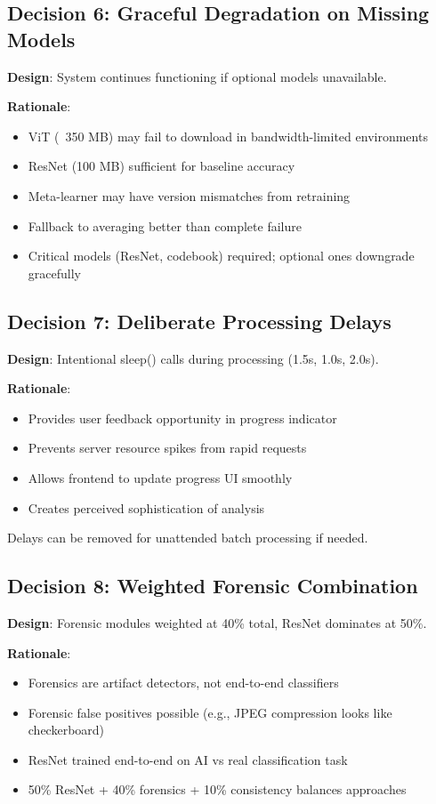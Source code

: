 \documentclass[12pt,a4paper]{book}
\begin{document}
\begin{itemize}
\subsection{Decision 6: Graceful Degradation on Missing Models}

\textbf{Design}: System continues functioning if optional models unavailable.

\textbf{Rationale}:
\begin{itemize}
    \item ViT (~350 MB) may fail to download in bandwidth-limited environments
    \item ResNet (100 MB) sufficient for baseline accuracy
    \item Meta-learner may have version mismatches from retraining
    \item Fallback to averaging better than complete failure
    \item Critical models (ResNet, codebook) required; optional ones downgrade gracefully
\end{itemize}

\subsection{Decision 7: Deliberate Processing Delays}

\textbf{Design}: Intentional sleep() calls during processing (1.5s, 1.0s, 2.0s).

\textbf{Rationale}:
\begin{itemize}
    \item Provides user feedback opportunity in progress indicator
    \item Prevents server resource spikes from rapid requests
    \item Allows frontend to update progress UI smoothly
    \item Creates perceived sophistication of analysis
\end{itemize}

Delays can be removed for unattended batch processing if needed.

\subsection{Decision 8: Weighted Forensic Combination}

\textbf{Design}: Forensic modules weighted at 40\% total, ResNet dominates at 50\%.

\textbf{Rationale}:
\begin{itemize}
    \item Forensics are artifact detectors, not end-to-end classifiers
    \item Forensic false positives possible (e.g., JPEG compression looks like checkerboard)
    \item ResNet trained end-to-end on AI vs real classification task
    \item 50\% ResNet + 40\% forensics + 10\% consistency balances approaches
\end{itemize}


\end{itemize}
\end{document}
